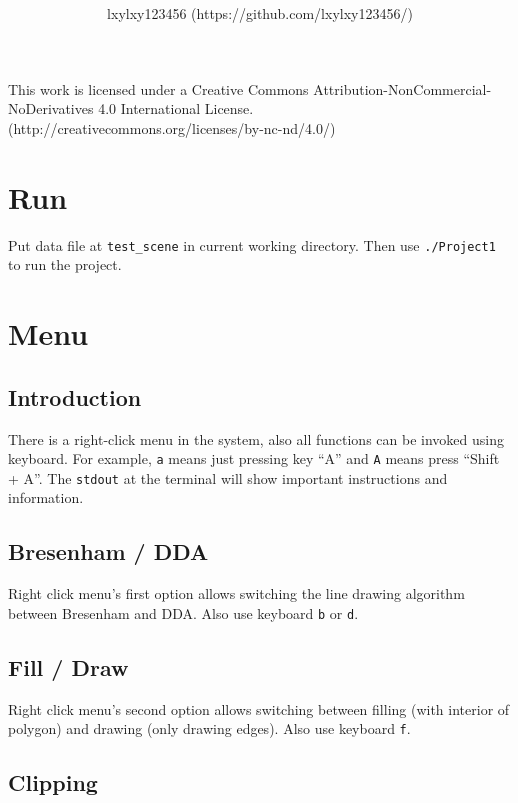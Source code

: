 \documentclass[11pt]{article}
\title{\bf \titleVar{}}
\author{lxylxy123456 (https://github.com/lxylxy123456/)}
\begin{document}
\maketitle

\renewcommand\thesubsection{\arabic{section}.\Alph{subsection}}

This work is licensed under a Creative Commons
Attribution-NonCommercial-NoDerivatives 4.0 International License.
(http://creativecommons.org/licenses/by-nc-nd/4.0/)

\section{Run}

Put data file at \lstinline{test_scene} in current working directory. 
 Then use \lstinline{./Project1} to run the project. 


\section{Menu}

\subsection{Introduction}

There is a right-click menu in the system, also all functions can be invoked
 using keyboard. For example, \lstinline{a} means just pressing key ``A'' and
 \lstinline{A} means press ``Shift + A''. The \lstinline{stdout} at the terminal
 will show important instructions and information. 

\subsection{Bresenham / DDA}

Right click menu's first option allows switching the line drawing algorithm
 between Bresenham and DDA. Also use keyboard \lstinline{b} or \lstinline{d}.

\subsection{Fill / Draw}

Right click menu's second option allows switching between filling (with interior
 of polygon) and drawing (only drawing edges). Also use keyboard \lstinline{f}.

\subsection{Clipping}
\end{document}
